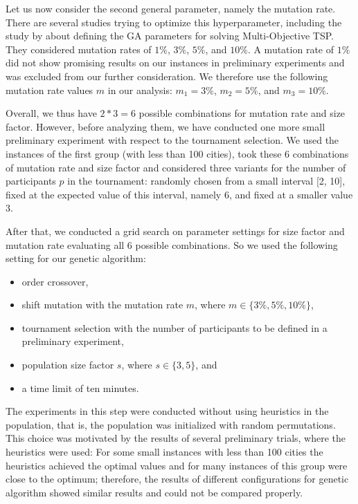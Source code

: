 Let us now consider the second general parameter, namely the mutation rate. There are several studies trying to optimize this hyperparameter, including the study by \citeauthor{beed2017study} \cite{beed2017study} about defining the GA parameters for solving Multi-Objective TSP. They considered mutation rates of $1\%$, $3\%$, $5\%$, and $10\%$. A mutation rate of $1\%$ did not show promising results on our instances in preliminary experiments and was excluded from our further consideration. We therefore use the following mutation rate values $m$ in our analysis: $m_{1} = 3\%$, $m_{2} = 5\%$, and $m_{3} = 10\%$.

Overall, we thus have $2 * 3 = 6$ possible combinations for mutation rate and size factor. However, before analyzing them, we have conducted one more small preliminary experiment with respect to the tournament selection. We used the instances of the first group (with less than 100 cities), took these 6 combinations of mutation rate and size factor and considered three variants for the number of participants $p$ in the tournament: randomly chosen from a small interval [2, 10], fixed at the expected value of this interval, namely 6, and fixed at a smaller value 3.\par  

After that, we conducted a grid search on parameter settings for size factor and mutation rate evaluating all 6 possible combinations. So we used the following setting for our genetic algorithm:
\begin{itemize}
	\item order crossover,
	\item shift mutation with the mutation rate $m$, where $m \in \{3\%, 5\%, 10\%\}$,
	\item tournament selection with the number of participants to be defined in a preliminary experiment,
	\item population size factor $s$, where $s \in \{3, 5\}$, and
	\item a time limit of ten minutes.
\end{itemize}

The experiments in this step were conducted without using heuristics in the population, that is, the population was initialized with random permutations. This choice was motivated by the results of several preliminary trials, where the heuristics were used: For some small instances with less than 100 cities the heuristics achieved the optimal values  and for many instances of this group were close to the optimum; therefore, the results of different configurations for genetic algorithm showed similar results and could not be compared properly.  \par 

